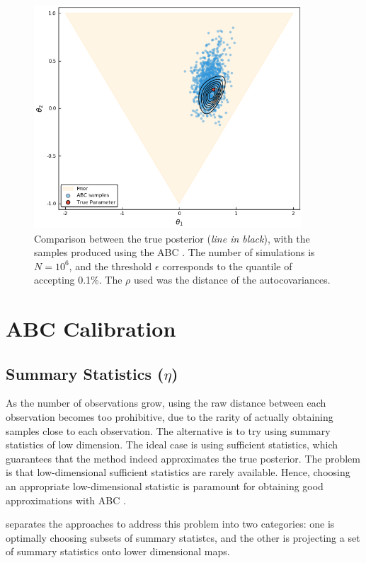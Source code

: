 \documentclass[runningheads]{llncs}
\begin{document}
  \begin{figure}[H]
      \centering
      \includegraphics[width=10cm]{images/ABCmodel1.png}
      \caption{Comparison between the true posterior
      (\textit{line in black}), with the samples produced using the ABC
      . The number of simulations is $N = 10^6$,
      and the threshold $\epsilon$ corresponds to the quantile of
      accepting 0.1\%. The $\rho$ used was the distance
      of the autocovariances.}
  \end{figure}

\section{ABC Calibration}
\subsection{Summary Statistics ($\eta$)}
\label{subsec:statistical-summaries}

As the number of observations
grow, using the raw distance between each observation becomes too
prohibitive, due to the rarity of actually
obtaining samples close to each observation.
The alternative is to try using summary statistics of low dimension.
The ideal case is using sufficient statistics, which guarantees that the
method indeed approximates the true posterior.
The problem is that
low-dimensional sufficient statistics are rarely available. Hence,
choosing an appropriate low-dimensional statistic is paramount for
obtaining good approximations with ABC \citep{Marin2012}.

\citet{Beaumont2018} separates the approaches to address this
problem into two categories: one is optimally choosing
subsets of summary statistcs, and the other is projecting
a set of summary statistics onto lower dimensional maps.
\end{document}
